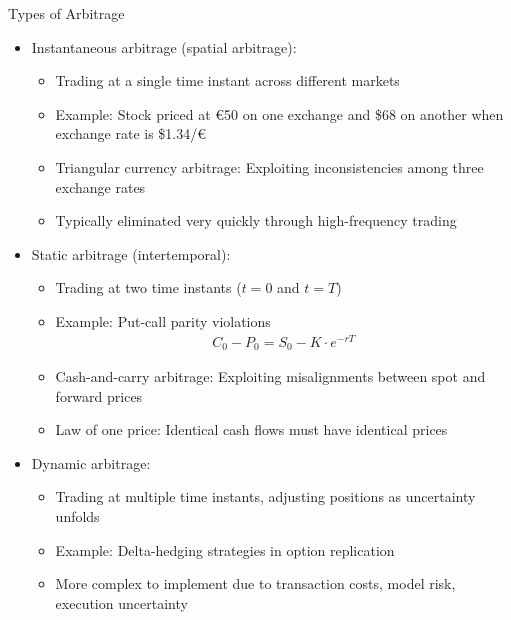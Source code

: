 \documentclass[10pt]{beamer}
\begin{document}
\begin{frame}{Types of Arbitrage}
  \begin{itemize}[<+->]
    \item Instantaneous arbitrage (spatial arbitrage):
      \begin{itemize}
        \item Trading at a single time instant across different markets
        \item Example: Stock priced at €50 on one exchange and \$68 on another when exchange rate is \$1.34/€
        \item Triangular currency arbitrage: Exploiting inconsistencies among three exchange rates
        \item Typically eliminated very quickly through high-frequency trading
      \end{itemize}
      
    \item Static arbitrage (intertemporal):
      \begin{itemize}
        \item Trading at two time instants ($t=0$ and $t=T$)
        \item Example: Put-call parity violations
          \begin{align*}
            C_0 - P_0 = S_0 - K \cdot e^{-rT}
          \end{align*}
        \item Cash-and-carry arbitrage: Exploiting misalignments between spot and forward prices
        \item Law of one price: Identical cash flows must have identical prices
      \end{itemize}
      
    \item Dynamic arbitrage:
      \begin{itemize}
        \item Trading at multiple time instants, adjusting positions as uncertainty unfolds
        \item Example: Delta-hedging strategies in option replication
        \item More complex to implement due to transaction costs, model risk, execution uncertainty
      \end{itemize}
  \end{itemize}
\end{frame}
\end{document}
